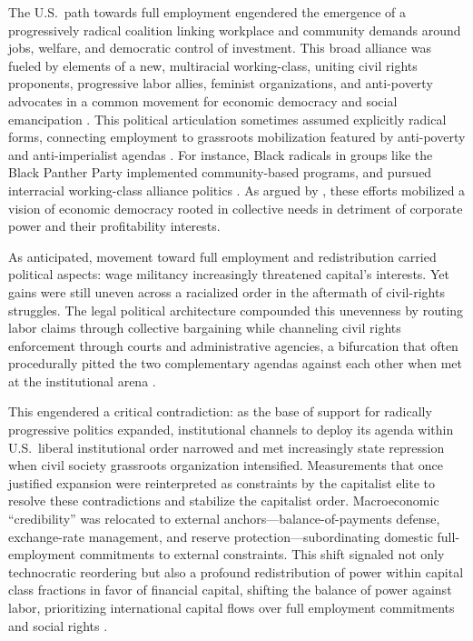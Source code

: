 \documentclass[11pt]{article}
\begin{document}
The U.S.\ path towards full employment engendered the emergence of a progressively radical coalition linking workplace and community demands around jobs, welfare, and democratic control of investment. This broad alliance was fueled by elements of a new, multiracial working-class, uniting civil rights proponents, progressive labor allies, feminist organizations, and anti-poverty advocates in a common movement for economic democracy and social emancipation \citep{dennis2022}. This political articulation sometimes assumed explicitly radical forms, connecting employment to grassroots mobilization featured by anti-poverty and anti-imperialist agendas \citep{mohandesi2017}. For instance, Black radicals in groups like the Black Panther Party implemented community-based programs, and pursued interracial working-class alliance politics \citep{tyner2006}. As argued by \citet{dennis2022}, these efforts mobilized a vision of economic democracy rooted in collective needs in detriment of corporate power and their profitability interests.

As \citet{kalecki1943} anticipated, movement toward full employment and redistribution carried political aspects: wage militancy increasingly threatened capital's interests. Yet gains were still uneven across a racialized order in the aftermath of civil-rights struggles. The legal political architecture compounded this unevenness by routing labor claims through collective bargaining while channeling civil rights enforcement through courts and administrative agencies, a bifurcation that often procedurally pitted the two complementary agendas against each other when met at the institutional arena \citep{schiller2015}.

This engendered a critical contradiction: as the base of support for radically progressive politics expanded, institutional channels to deploy its agenda within U.S.\ liberal institutional order narrowed and met increasingly state repression when civil society grassroots organization intensified. Measurements that once justified expansion were reinterpreted as constraints by the capitalist elite to resolve these contradictions and stabilize the capitalist order. Macroeconomic ``credibility'' was relocated to external anchors---balance-of-payments defense, exchange-rate management, and reserve protection---subordinating domestic full-employment commitments to external constraints. This shift signaled not only technocratic reordering but also a profound redistribution of power within capital class fractions in favor of financial capital, shifting the balance of power against labor, prioritizing international capital flows over full employment commitments and social rights \citep{vernengo2021}.
\end{document}
